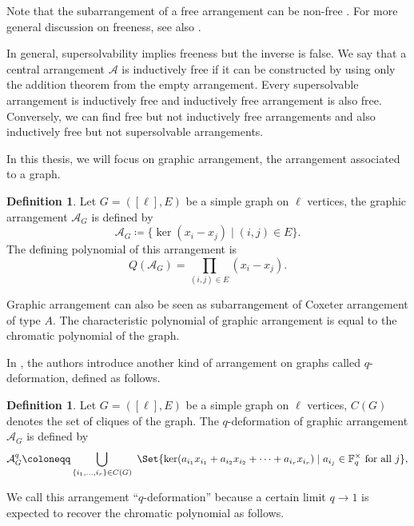 \documentclass[12pt]{article}
\theoremstyle{plain}%
\theoremstyle{definition}
\newtheorem{definition}[theorem]{Definition}
\begin{document}
Note that the subarrangement of a free arrangement can be non-free \cite{edelman1993counterexample}. For more general discussion on freeness, see also \cite{dimca2017hyperplane}. 

In general, supersolvability implies freeness but the inverse is false. We say that a central arrangement $\mathcal{A}$ is inductively free if it can be constructed by using only the addition theorem from the empty arrangement. Every supersolvable arrangement is inductively free \cite{jambu1984free-aim} and inductively free arrangement is also free. Conversely, we can find free but not inductively free arrangements and also inductively free but not supersolvable arrangements\cite{orlik1992arrangements}.

In this thesis, we will focus on graphic arrangement, the arrangement associated to a graph. 

\begin{definition}
    Let $G=([\ell], E)$ be a simple graph on $\ell$ vertices, the graphic arrangement $\mathcal{A}_G$ is defined by
    $$\mathcal{A}_G\coloneqq\{\ker{(x_i-x_j)}\mid (i,j)\in E\}.$$
    The defining polynomial of this arrangement is $$Q(\mathcal{A}_G)=\prod_{(i,j)\in E}(x_i-x_j).$$
\end{definition}

Graphic arrangement can also be seen as subarrangement of Coxeter arrangement of type $A$. The characteristic polynomial of graphic arrangement is equal to the chromatic polynomial of the graph.

In \cite{nian2024qdeformationchromaticpolynomialsgraphical}, the authors introduce another kind of arrangement on graphs called $q$-deformation, defined as follows.
\begin{definition}
Let $G=([\ell], E)$ be a simple graph on $\ell$ vertices, $C(G)$ denotes the set of cliques of the graph. The $q$-deformation of graphic arrangement $\mathcal{A}_G$ is defined by 
    \begin{align*}
\mathcal{A}_{G}^{q} \coloneqq \bigcup_{\{i_{1}, \dots, i_{r}\}\in C(G)}\ \Set{\ker  (a_{i_{1}}x_{i_{1}} +a_{i_2}x_{i_2} +\dots + a_{i_{r}}x_{i_{r}} )  \mid a_{i_j}\in \mathbb{F}_q^\times\text{ for all }j}, 
\end{align*}
\end{definition}

We call this arrangement ``$q$-deformation'' because a certain limit $q\to 1$ is expected to recover the chromatic polynomial as follows.
\end{document}
